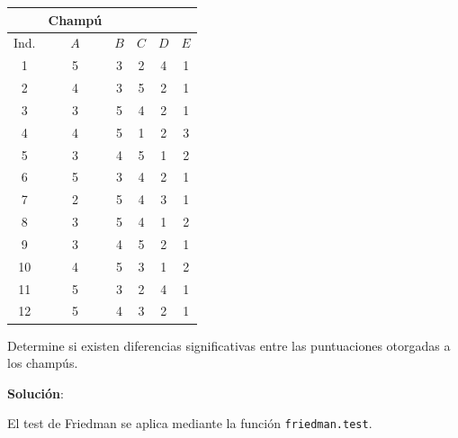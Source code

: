 \documentclass[
]{article}
\begin{document}
\begin{longtable}[]{@{}cccccc@{}}
\toprule\noalign{}
& Champú & & & & \\
\midrule\noalign{}
\endhead
\bottomrule\noalign{}
\endlastfoot
Ind. & \(A\) & \(B\) & \(C\) & \(D\) & \(E\) \\
1 & 5 & 3 & 2 & 4 & 1 \\
2 & 4 & 3 & 5 & 2 & 1 \\
3 & 3 & 5 & 4 & 2 & 1 \\
4 & 4 & 5 & 1 & 2 & 3 \\
5 & 3 & 4 & 5 & 1 & 2 \\
6 & 5 & 3 & 4 & 2 & 1 \\
7 & 2 & 5 & 4 & 3 & 1 \\
8 & 3 & 5 & 4 & 1 & 2 \\
9 & 3 & 4 & 5 & 2 & 1 \\
10 & 4 & 5 & 3 & 1 & 2 \\
11 & 5 & 3 & 2 & 4 & 1 \\
12 & 5 & 4 & 3 & 2 & 1 \\
\end{longtable}

Determine si existen diferencias significativas entre las puntuaciones otorgadas a los champús.

\textbf{Solución}:

El test de Friedman se aplica mediante la función \texttt{friedman.test}.
\end{document}
